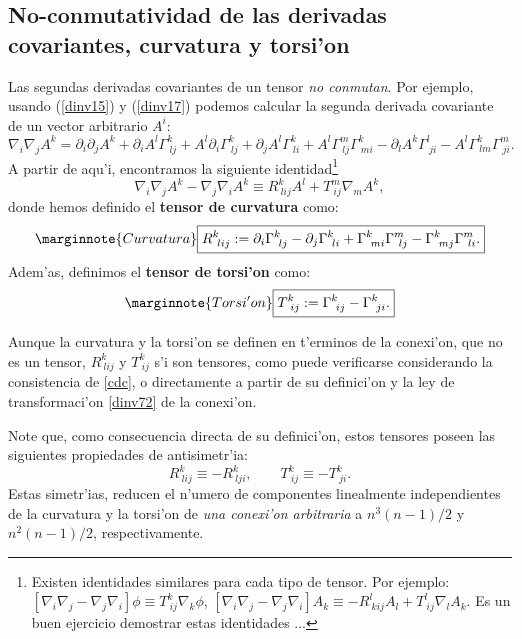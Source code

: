 \subsection{No-conmutatividad de las derivadas covariantes, curvatura y torsi'on}\label{sec:RT}
Las segundas derivadas covariantes de un tensor \textit{no conmutan}.
Por ejemplo, usando (\ref{dinv15}) y (\ref{dinv17}) podemos calcular la segunda derivada covariante de un vector arbitrario $A^i$:
\begin{equation}
\nabla_i \nabla_jA^k =\partial_i \partial_jA^{k
}+\partial_i A^l\Gamma_{\ lj}^k +A^l\partial
_i \Gamma_{\ lj}^k +\partial_jA^l\Gamma_{\ li}^k
+A^l\Gamma_{\ lj}^{m}\Gamma_{\ mi}^k -\partial_{l}A^k \Gamma_{\
ji}^l-A^l\Gamma_{\ lm}^k \Gamma_{\ ji}^{m}. \label{segder1}
\end{equation}
A partir de aqu'i, encontramos la siguiente identidad\footnote{Existen identidades similares para cada tipo de tensor. Por ejemplo: $\left[\nabla_i \nabla_j -\nabla_j\nabla_i\right]\phi\equiv T_{\ ij}^{k} \nabla_k\phi$,  $\left[\nabla_i \nabla_j -\nabla_j\nabla_i\right]A_k\equiv -R_{\ kij}^lA_l+T_{\ ij}^{l} \nabla_lA_k$. Es un buen ejercicio demostrar estas identidades ...}
\begin{equation}
\boxed{\nabla_i \nabla_jA^k -\nabla_j\nabla_i A^{k}\equiv R_{\ lij}^k
A^l+T_{\ ij}^{m} \nabla_mA^k ,} \label{cdc}
\end{equation}
donde hemos definido el \textbf{tensor de curvatura} como:
\begin{equation}\marginnote{Curvatura}
\boxed{R_{\ lij}^k :=\partial_i\Gamma_{\ lj}^k -\partial_j\Gamma_{\ li}^k 
+\Gamma_{\ mi}^k \Gamma_{\ lj}^m -\Gamma_{\ mj}^k \Gamma_{\ li}^m .}
\label{curvatura}
\end{equation}
Adem'as, definimos el \textbf{tensor de torsi'on} como:
\begin{equation}\marginnote{Torsi'on}
\boxed{T_{\ ij}^k :=\Gamma_{\ ij}^k -\Gamma_{\ ji}^k .}
\end{equation}

Aunque la curvatura y la torsi'on se definen en t'erminos de la conexi'on,
que no es un tensor, $R_{\ lij}^k$ y $T_{\ ij}^k$ s'i son tensores, como
puede verificarse considerando la consistencia de \eqref{cdc}, o directamente
a partir de su definici'on y la ley de transformaci'on \eqref{dinv72} de la conexi'on.

Note que, como consecuencia directa de su definici'on, estos tensores poseen las siguientes propiedades de antisimetr'ia:
\begin{equation}
R_{\ lij}^k\equiv - R_{\ lji}^k, \qquad T_{\ ij}^k\equiv -T_{\ ji}^k. \label{asRT}
\end{equation}
Estas simetr'ias, reducen el n'umero de componentes linealmente independientes de la curvatura y la torsi'on de \textit{una conexi'on arbitraria} a $n^3(n-1)/2$ y $n^2(n-1)/2$, respectivamente.

